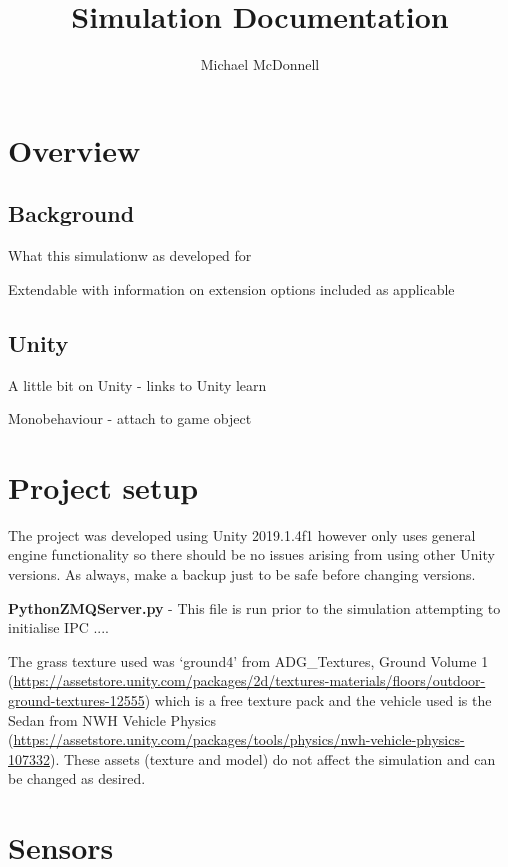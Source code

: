 \documentclass{article}
\begin{document}
\title{Simulation Documentation}
\author{Michael McDonnell}

\maketitle

\tableofcontents

\section*{Overview}

\subsection*{Background}

What this simulationw as developed for

Extendable with information on extension options included as applicable

\subsection*{Unity}
A little bit on Unity - links to Unity learn

Monobehaviour - attach to game object
\section{Project setup}

The project was developed using Unity 2019.1.4f1 however only uses general engine functionality so there should be no issues arising from using other Unity versions. As always, make a backup just to be safe before changing versions.

\textbf{PythonZMQServer.py} - This file is run prior to the simulation attempting to initialise IPC ....

The grass texture used was `ground4' from ADG\_Textures, Ground Volume 1 (\url{https://assetstore.unity.com/packages/2d/textures-materials/floors/outdoor-ground-textures-12555}) which is a free texture pack and the vehicle used is the Sedan from NWH Vehicle Physics (\url{https://assetstore.unity.com/packages/tools/physics/nwh-vehicle-physics-107332}). These assets (texture and model) do not affect the simulation and can be changed as desired.

\section{Sensors}
\end{document}
